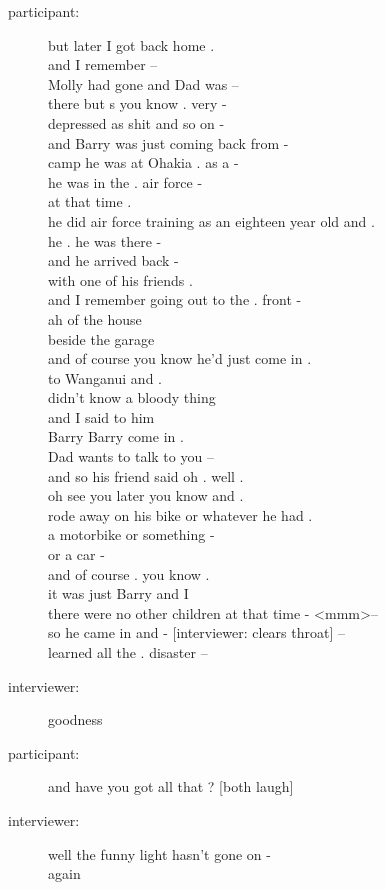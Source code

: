\documentclass{article}
\newcommand{\turn}[2]{
\item[#1:] #2
}
\begin{document}
\begin{description}
\turn{participant}{but later I got back home .\\
and I remember --\\
Molly had gone and Dad was --\\
there but s you know . very -\\
depressed as shit and so on -\\
and Barry was just coming back from -\\
camp he was at Ohakia . as a -\\
he was in the . air force -\\
at that time .\\
he did air force training as an eighteen year old and .\\
he . he was there -\\
and he arrived back -\\
with one of his friends .\\
and I remember going out to the . front -\\
ah of the house\\
beside the garage\\
and of course you know he'd just come in .\\
to Wanganui and .\\
didn't know a bloody thing\\
and I said to him\\
Barry Barry come in .\\
Dad wants to talk to you --\\
and so his friend said oh . well .\\
oh see you later you know and .\\
rode away on his bike or whatever he had .\\
a motorbike or something -\\
or a car -\\
and of course . you know .\\
it was just Barry and I\\
there were no other children at that time - \textless mmm\textgreater  --\\
so he came in and - [interviewer: clears throat] --\\
learned all the . disaster --}

\turn{interviewer}{goodness}

\turn{participant}{and have you got all that ? [both laugh]}

\turn{interviewer}{well the funny light hasn't gone on -\\
again}


\end{description}
\end{document}
